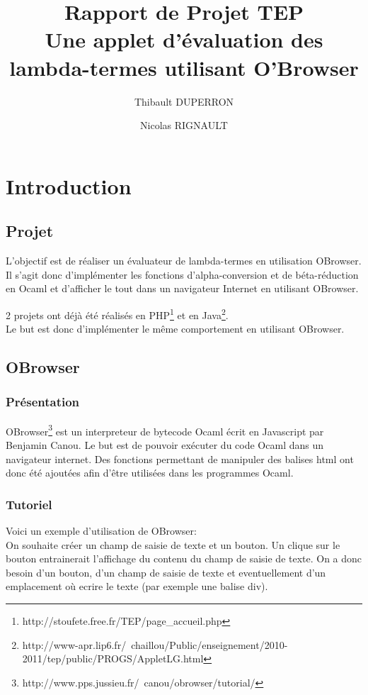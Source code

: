 \documentclass[a4paper,11pt,titlepage]{article}
\title{Rapport de Projet TEP\\Une applet d'évaluation des lambda-termes utilisant O'Browser}
\author{Thibault DUPERRON \and Nicolas RIGNAULT}
\begin{document}
\renewcommand{\bibname}{}
\renewcommand{\refname}{}
\maketitle
\tableofcontents

\newpage
\section{Introduction}

\subsection{Projet}

L'objectif est de réaliser un évaluateur de lambda-termes en utilisation OBrowser. Il s'agit donc d'implémenter les fonctions d'alpha-conversion et de béta-réduction en Ocaml et d'afficher le tout dans un navigateur Internet en utilisant OBrowser.

2 projets ont déjà été réalisés en PHP\footnote{http://stoufete.free.fr/TEP/page\_accueil.php} et en Java\footnote{http://www-apr.lip6.fr/~chaillou/Public/enseignement/2010-2011/tep/public/PROGS/AppletLG.html}.\\

Le but est donc d'implémenter le même comportement en utilisant OBrowser.


\subsection{OBrowser}

\subsubsection{Présentation}
OBrowser\footnote{http://www.pps.jussieu.fr/~canou/obrowser/tutorial/} est un interpreteur de bytecode Ocaml écrit en Javascript par Benjamin Canou. Le but est de pouvoir exécuter du code Ocaml dans un navigateur internet. Des fonctions permettant de manipuler des balises html ont donc été ajoutées afin d'être 
utilisées dans les programmes Ocaml.

\subsubsection{Tutoriel}
Voici un exemple d'utilisation de OBrowser:\\

On souhaite créer un champ de saisie de texte et un bouton. Un clique sur le bouton entrainerait l'affichage du contenu du champ de saisie de texte. On a donc besoin d'un bouton, d'un champ de saisie de texte et eventuellement d'un emplacement où ecrire le texte (par exemple une balise div).
\end{document}
